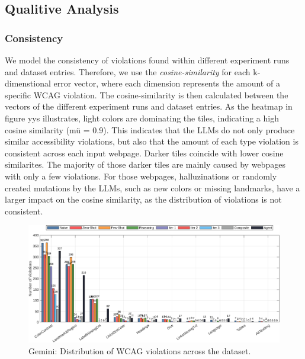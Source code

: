 \subsection{Qualitive Analysis}
\subsubsection{Consistency}
We model the consistency of violations found within different 
experiment runs and dataset entries. Therefore, we use the \textit{cosine-similarity} for 
each k-dimenstional error vector, where each dimension represents the amount of a specific 
WCAG violation. The cosine-similarity is then calculated between the vectors of the 
different experiment runs and dataset entries. As the heatmap in figure yys illustrates,
light colors are dominating the tiles, indicating a high cosine similarity (mü = 0.9). This 
indicates that the LLMs do not only produce similar accessibility violations, but also that 
the amount of each type violation is consistent across each input webpage. Darker tiles 
coincide with lower cosine similarites. The majority of those darker tiles are mainly caused 
by webpages with only a few violations. For those webpages, halluzinations or randomly 
created mutations by the LLMs, such 
as new colors or missing landmarks, have a larger impact on the cosine similarity, as 
the distribution of violations is not consistent. 


\begin{figure}[p]
  \centering
  \includegraphics[width=\textwidth]{figures/gemini_wcag_bar.png}
  \caption{Gemini: Distribution of WCAG violations across the dataset.}
  \label{fig:gemini_wcag_bar}
\end{figure}


